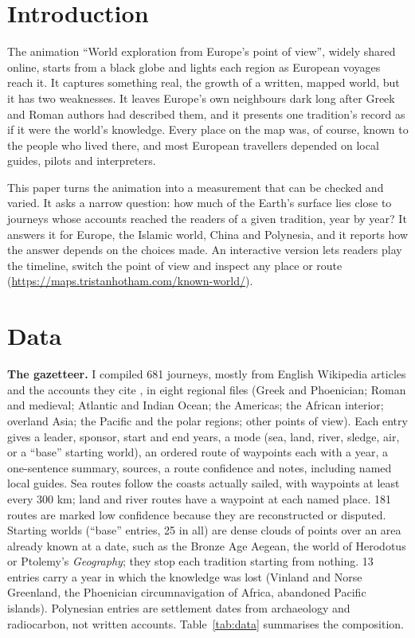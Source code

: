 \documentclass[11pt,a4paper]{article}
\begin{document}
\section{Introduction}
The animation ``World exploration from Europe's point of view'', widely shared online, starts from a black globe and lights each region as European voyages reach it. It captures something real, the growth of a written, mapped world, but it has two weaknesses. It leaves Europe's own neighbours dark long after Greek and Roman authors had described them, and it presents one tradition's record as if it were the world's knowledge. Every place on the map was, of course, known to the people who lived there, and most European travellers depended on local guides, pilots and interpreters.

This paper turns the animation into a measurement that can be checked and varied. It asks a narrow question: how much of the Earth's surface lies close to journeys whose accounts reached the readers of a given tradition, year by year? It answers it for Europe, the Islamic world, China and Polynesia, and it reports how the answer depends on the choices made. An interactive version lets readers play the timeline, switch the point of view and inspect any place or route (\url{https://maps.tristanhotham.com/known-world/}).

\section{Data}
\textbf{The gazetteer.} I compiled 681 journeys, mostly from English Wikipedia articles and the accounts they cite \citep{wiki}, in eight regional files (Greek and Phoenician; Roman and medieval; Atlantic and Indian Ocean; the Americas; the African interior; overland Asia; the Pacific and the polar regions; other points of view). Each entry gives a leader, sponsor, start and end years, a mode (sea, land, river, sledge, air, or a ``base'' starting world), an ordered route of waypoints each with a year, a one-sentence summary, sources, a route confidence and notes, including named local guides. Sea routes follow the coasts actually sailed, with waypoints at least every 300 km; land and river routes have a waypoint at each named place. 181 routes are marked low confidence because they are reconstructed or disputed. Starting worlds (``base'' entries, 25 in all) are dense clouds of points over an area already known at a date, such as the Bronze Age Aegean, the world of Herodotus or Ptolemy's \textit{Geography}; they stop each tradition starting from nothing. 13 entries carry a year in which the knowledge was lost (Vinland and Norse Greenland, the Phoenician circumnavigation of Africa, abandoned Pacific islands). Polynesian entries are settlement dates from archaeology and radiocarbon, not written accounts. Table~\ref{tab:data} summarises the composition.
\end{document}
